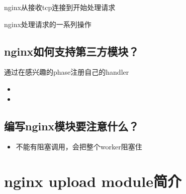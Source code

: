 \documentclass[aspectratio=169]{ctexbeamer}
\begin{document}
\begin{frame}{\subsecname}{nginx从接收tcp连接到开始处理请求}
  
  
  
\end{frame}

\begin{frame}{\subsecname}{nginx处理请求的一系列操作}
  
  
\end{frame}

\subsection{nginx如何支持第三方模块？}
\begin{frame}{\subsecname}{通过在感兴趣的phase注册自己的handler}
  
  \begin{itemize}
  \item<2-> 
  \item<3-> 
  \end{itemize}
\end{frame}

\subsection{编写nginx模块要注意什么？}
\begin{frame}{\subsecname}
  \begin{itemize}
  \item<2-> 不能有阻塞调用，会把整个worker阻塞住
  \end{itemize}
\end{frame}

\section{nginx upload module简介}
\end{document}
